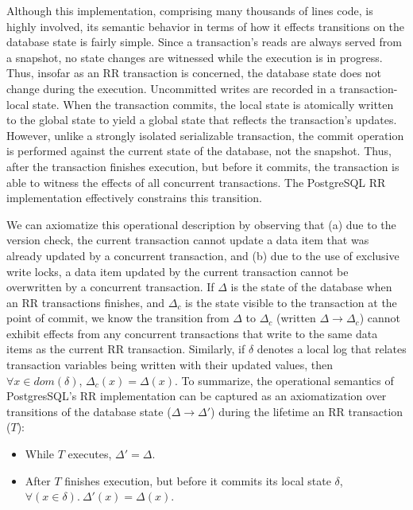 Although this implementation, comprising many thousands of lines code,
is highly involved, its semantic behavior in terms of how it effects
transitions on the database state is fairly simple.  Since a
transaction's reads are always served from a snapshot, no state
changes are witnessed while the execution is in progress. Thus,
insofar as an RR transaction is concerned, the database state does not
change during the execution.  Uncommitted writes are recorded in a
transaction-local state.  When the transaction commits, the local
state is atomically written to the global state to yield a global
state that reflects the transaction's updates.  However, unlike a
strongly isolated serializable transaction, the commit operation is
performed against the current state of the database, not the
snapshot. Thus, after the transaction finishes execution, but before
it commits, the transaction is able to witness the effects of all
concurrent transactions.  The PostgreSQL RR implementation effectively
constrains this transition.

We can axiomatize this operational description by observing that (a)
due to the version check, the current transaction cannot update a data
item that was already updated by a concurrent transaction, and (b) due
to the use of exclusive write locks, a data item updated by the
current transaction cannot be overwritten by a concurrent transaction.
If $\Delta$ is the state of the database when an RR transactions
finishes, and $\Delta_c$ is the state visible to the transaction at
the point of commit, we know the transition from $\Delta$ to
$\Delta_c$ (written $\Delta \longrightarrow \Delta_c$) cannot exhibit
effects from any concurrent transactions that write to the same data
items as the current RR transaction.  Similarly, if $\delta$ denotes
a local log that relates transaction variables being written with their updated values,
then $\forall x\in\mathit{dom}(\delta)$, $\Delta_c(x) =
\Delta(x)$. To summarize, the operational semantics of PostgresSQL's RR
implementation can be captured as an axiomatization over transitions of
the database state ($\Delta \longrightarrow \Delta'$) during the
lifetime an RR transaction ($T$):
\begin{itemize}
  \item While $T$ executes, $\Delta' = \Delta$.
  \item After $T$ finishes execution, but before it commits its local
    state $\delta$, $\forall(x\in\delta).~\Delta'(x) = \Delta(x)$.
\end{itemize}


